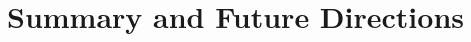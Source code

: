 \documentclass[usenames,dvipsnames]{beamer}
\begin{document}
%
%
%
%
%
%
%

\section{Summary and Future Directions}
\end{document}
